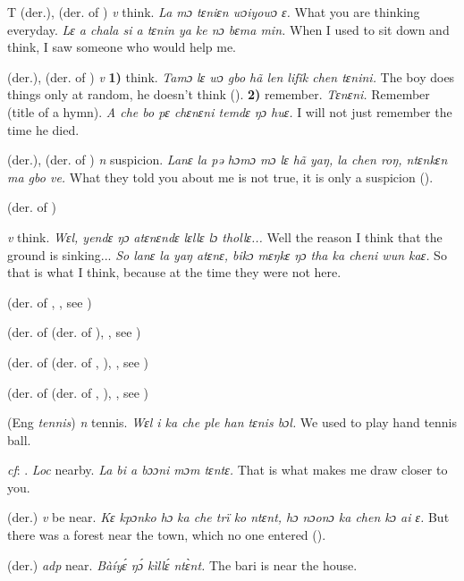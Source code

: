 \begin{letter}{T}
 (der.), (der. of ) \textit{v} think. \textit{La mɔ tɛniɛn wɔiyowɔ ɛ.} What you are thinking everyday. \textit{Lɛ a chala si a tɛnin ya ke nɔ bɛma min.} When I used to sit down and think, I saw someone who would help me. 

 (der.), (der. of ) \textit{v} \textbf{1)} think. \textit{Tamɔ lɛ wɔ gbo hã len lifǐk chen tɛnini.} The boy does things only at random, he doesn't think (\citealt{Pichl1967}). \textbf{2)} remember. \textit{Tɛnɛni.} Remember (title of a hymn). \textit{A che bo pɛ chɛnɛni temdɛ ŋɔ huɛ.} I will not just remember the time he died.

 (der.), (der. of ) \textit{n} suspicion. \textit{Lanɛ la pə hɔmɔ mɔ lɛ hã yaŋ, la chen roŋ, ntɛnkɛn ma gbo ve.} What they told you about me is not true, it is only a suspicion (\citealt{Pichl1967}). 

 (der. of )

 \textit{v} think. \textit{Wɛl, yendɛ ŋɔ atɛnɛndɛ lɛllɛ lɔ thollɛ...} Well the reason I think that the ground is sinking... \textit{So lanɛ la yaŋ atɛnɛ, bikɔ mɛŋkɛ ŋɔ tha ka cheni wun kaɛ.} So that is what I think, because at the time they were not here.

 (der. of , , see )

 (der. of  (der. of ), , see )

 (der. of  (der. of , ), , see ) 

 (der. of  (der. of , ), , see ) 

 (Eng \textit{tennis}) \textit{n} tennis. \textit{Wɛl i ka che ple han tɛnis bɔl.} We used to play hand tennis ball.

 \textit{cf}: . \textit{Loc} nearby. \textit{La bi a bɔɔni mɔm tɛntɛ.} That is what makes me draw closer to you.

 (der.) \textit{v} be near. \textit{Kɛ kpɔnko hɔ ka che trï ko ntɛnt, hɔ nɔonɔ ka chen kɔ ai ɛ.} But there was a forest near the town, which no one entered (\citealt{Pichl1967}).

 (der.) \textit{adp} near. \textit{Bàíyɛ́ ŋɔ́ kìllɛ́ ntɛ̀nt.} The bari is near the house.


\end{letter}
